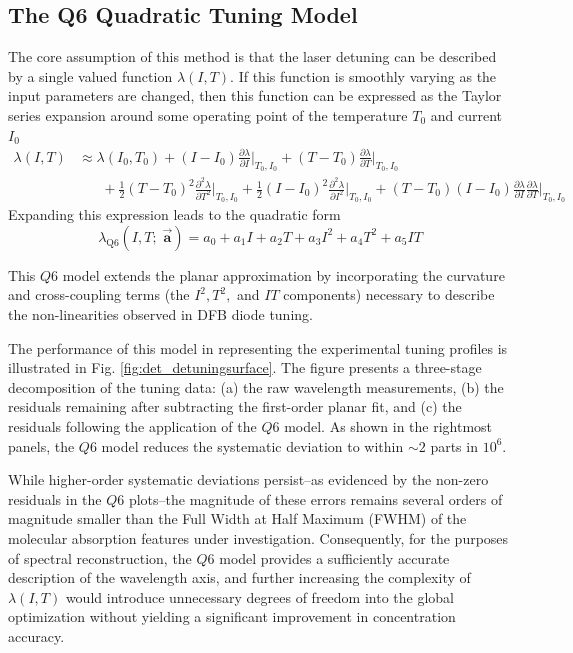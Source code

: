 \documentclass[12pt]{report}
\begin{document}
	\subsection{The Q6 Quadratic Tuning Model}
	The core assumption of this method is that the laser detuning can be described by a single valued function $\lambda(I, T)$. If this function is smoothly varying as the input parameters are changed, then this function can be expressed as the Taylor series expansion around some operating point of the temperature $T_0$ and current $I_0$
	\begin{align} \label{det_taylor}
		\lambda (I, T) &\approx \lambda(I_0, T_0) + (I-I_0) \frac{\partial \lambda}{\partial I} \Bigg|_{T_0,I_0} + (T-T_0)\frac{\partial \lambda}{\partial T}\Bigg|_{T_0,I_0}
		\nonumber\\&\;\;\;\;\;\; + \frac{1}{2} (T-T_0)^2 \frac{\partial^2 \lambda}{\partial T ^2}\Bigg|_{T_0,I_0}  + \frac{1}{2}(I-I_0)^2\frac{\partial^2 \lambda}{\partial I ^2}\Bigg|_{T_0,I_0} + (T-T_0)(I-I_0)\frac{\partial \lambda}{\partial I} \frac{\partial \lambda}{\partial T}\Bigg|_{T_0,I_0} 
	\end{align}
	Expanding this expression leads to the quadratic form
	\begin{equation} \label{det_quadratic}
		\lambda_\mathrm{Q6}(I, T;\; \vec{\mathbf{a}}) = a_0 + a_1 I + a_2 T + a_3 I^2 + a_4 T^2 + a_5 IT
	\end{equation}
	
	This $Q6$ model extends the planar approximation by incorporating the curvature and cross-coupling terms (the $I^2, T^2,$ and $IT$ components) necessary to describe the non-linearities observed in DFB diode tuning.
	
	The performance of this model in representing the experimental tuning profiles is illustrated in Fig. \ref{fig:det_detuningsurface}. The figure presents a three-stage decomposition of the tuning data: (a) the raw wavelength measurements, (b) the residuals remaining after subtracting the first-order planar fit, and (c) the residuals following the application of the $Q6$ model. As shown in the rightmost panels, the $Q6$ model reduces the systematic deviation to within $\sim 2$ parts in $10^6$.
	
	While higher-order systematic deviations persist--as evidenced by the non-zero residuals in the $Q6$ plots--the magnitude of these errors remains several orders of magnitude smaller than the Full Width at Half Maximum (FWHM) of the molecular absorption features under investigation. Consequently, for the purposes of spectral reconstruction, the $Q6$ model provides a sufficiently accurate description of the wavelength axis, and further increasing the complexity of $\lambda(I, T)$ would introduce unnecessary degrees of freedom into the global optimization without yielding a significant improvement in concentration accuracy.
	
\end{document}
